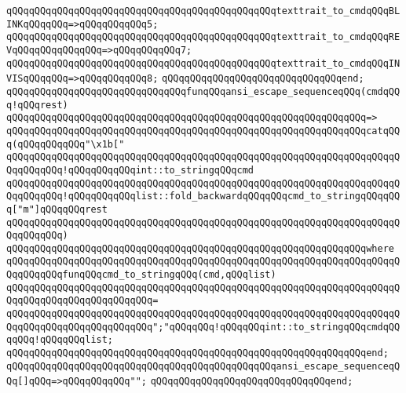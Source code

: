 \verb|qQQqqQQqqQQqqQQqqQQqqQQqqQQqqQQqqQQqqQQqqQQqqQQqtexttrait_to_cmdqQQqBLINKqQQqqQQq=>qQQqqQQqqQQq5;|\newline
\verb|qQQqqQQqqQQqqQQqqQQqqQQqqQQqqQQqqQQqqQQqqQQqqQQqtexttrait_to_cmdqQQqREVqQQqqQQqqQQqqQQq=>qQQqqQQqqQQq7;|\newline
\verb|qQQqqQQqqQQqqQQqqQQqqQQqqQQqqQQqqQQqqQQqqQQqqQQqtexttrait_to_cmdqQQqINVISqQQqqQQq=>qQQqqQQqqQQq8;|\newline
\verb|qQQqqQQqqQQqqQQqqQQqqQQqqQQqqQQqend;|\newline
\newline
\verb|qQQqqQQqqQQqqQQqqQQqqQQqqQQqqQQqfunqQQqansi_escape_sequenceqQQq(cmdqQQq!qQQqrest)|\newline
\verb|qQQqqQQqqQQqqQQqqQQqqQQqqQQqqQQqqQQqqQQqqQQqqQQqqQQqqQQqqQQqqQQq=>|\newline
\verb|qQQqqQQqqQQqqQQqqQQqqQQqqQQqqQQqqQQqqQQqqQQqqQQqqQQqqQQqqQQqqQQqcatqQQq(qQQqqQQqqQQq"\x1b["|\newline
\verb|qQQqqQQqqQQqqQQqqQQqqQQqqQQqqQQqqQQqqQQqqQQqqQQqqQQqqQQqqQQqqQQqqQQqqQQqqQQqqQQq!qQQqqQQqqQQqint::to_stringqQQqcmd|\newline
\verb|qQQqqQQqqQQqqQQqqQQqqQQqqQQqqQQqqQQqqQQqqQQqqQQqqQQqqQQqqQQqqQQqqQQqqQQqqQQqqQQq!qQQqqQQqqQQqlist::fold_backwardqQQqqQQqcmd_to_stringqQQqqQQq["m"]qQQqqQQqrest|\newline
\verb|qQQqqQQqqQQqqQQqqQQqqQQqqQQqqQQqqQQqqQQqqQQqqQQqqQQqqQQqqQQqqQQqqQQqqQQqqQQqqQQq)|\newline
\verb|qQQqqQQqqQQqqQQqqQQqqQQqqQQqqQQqqQQqqQQqqQQqqQQqqQQqqQQqqQQqqQQqwhere|\newline
\verb|qQQqqQQqqQQqqQQqqQQqqQQqqQQqqQQqqQQqqQQqqQQqqQQqqQQqqQQqqQQqqQQqqQQqqQQqqQQqqQQqfunqQQqcmd_to_stringqQQq(cmd,qQQqlist)|\newline
\verb|qQQqqQQqqQQqqQQqqQQqqQQqqQQqqQQqqQQqqQQqqQQqqQQqqQQqqQQqqQQqqQQqqQQqqQQqqQQqqQQqqQQqqQQqqQQqqQQq=|\newline
\verb|qQQqqQQqqQQqqQQqqQQqqQQqqQQqqQQqqQQqqQQqqQQqqQQqqQQqqQQqqQQqqQQqqQQqqQQqqQQqqQQqqQQqqQQqqQQqqQQq";"qQQqqQQq!qQQqqQQqint::to_stringqQQqcmdqQQqqQQq!qQQqqQQqlist;|\newline
\verb|qQQqqQQqqQQqqQQqqQQqqQQqqQQqqQQqqQQqqQQqqQQqqQQqqQQqqQQqqQQqqQQqend;|\newline
\newline
\verb|qQQqqQQqqQQqqQQqqQQqqQQqqQQqqQQqqQQqqQQqqQQqqQQqansi_escape_sequenceqQQq[]qQQq=>qQQqqQQqqQQq"";|\newline
\verb|qQQqqQQqqQQqqQQqqQQqqQQqqQQqqQQqend;|\newline
